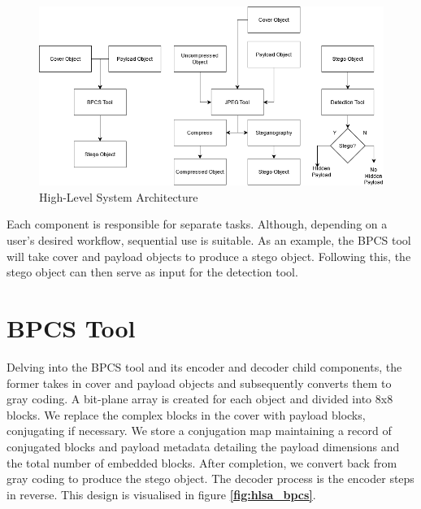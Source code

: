 \documentclass{l4proj}
\begin{document}
\begin{figure}[!h]
    \centering
    \includegraphics[width=1.0\linewidth]{images/system_architecture.png}    
    \caption{High-Level System Architecture}
    \label{fig:hlsa} 
\end{figure}

Each component is responsible for separate tasks. Although, depending on a user's desired workflow, sequential use is suitable. As an example, the BPCS tool will take cover and payload objects to produce a stego object. Following this, the stego object can then serve as input for the detection tool.

\section{BPCS Tool} \label{bpcs_design}

Delving into the BPCS tool and its encoder and decoder child components, the former takes in cover and payload objects and subsequently converts them to gray coding. A bit-plane array is created for each object and divided into 8x8 blocks. We replace the complex blocks in the cover with payload blocks, conjugating if necessary. We store a conjugation map maintaining a record of conjugated blocks and payload metadata detailing the payload dimensions and the total number of embedded blocks. After completion, we convert back from gray coding to produce the stego object. The decoder process is the encoder steps in reverse. This design is visualised in figure \textbf{\ref{fig:hlsa_bpcs}}.
\end{document}
